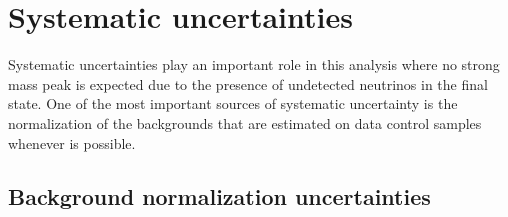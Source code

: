 \section{Systematic uncertainties}
\label{sec:Systematics}

Systematic uncertainties play an important role in this analysis where
no strong mass peak is expected due to the presence of undetected
neutrinos in the final state.  One of the most important sources of
systematic uncertainty is the normalization of the backgrounds that
are estimated on data control samples whenever is possible.

\subsection{Background normalization uncertainties}

